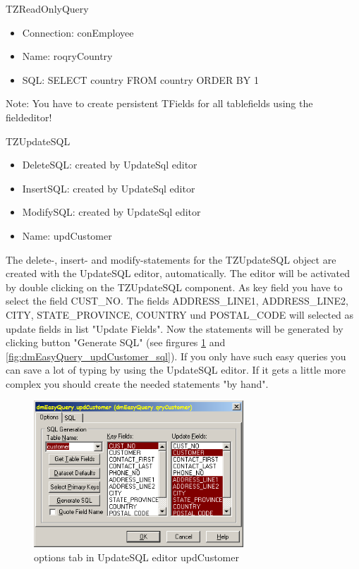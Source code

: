 \documentclass[a4paper,12pt,oneside]{book}
\begin{document}
TZReadOnlyQuery
\begin{itemize}
  \item Connection: conEmployee
	\item Name: roqryCountry
	\item SQL: SELECT country FROM country ORDER BY 1
\end{itemize}

Note: You have to create persistent TFields for all tablefields using the fieldeditor!

TZUpdateSQL
\begin{itemize}
  \item DeleteSQL: created by UpdateSql editor
  \item InsertSQL: created by UpdateSql editor
  \item ModifySQL: created by UpdateSql editor
  \item Name: updCustomer
\end{itemize}

The delete-, insert- and modify-statements for the TZUpdateSQL object are created with the UpdateSQL editor, automatically.
The editor will be activated by double clicking on the TZUpdateSQL component.
As key field you have to select the field CUST\_NO. The fields ADDRESS\_LINE1, ADDRESS\_LINE2, CITY, STATE\_PROVINCE, COUNTRY und POSTAL\_CODE will selected as update fields in list "Update Fields".
Now the statements will be generated by clicking button "Generate SQL" (see firgures \ref{fig:dmEasyQuery_updCustomer_options} and \ref{fig:dmEasyQuery_updCustomer_sql}).
If you only have such easy queries you can save a lot of typing by using the UpdateSQL editor.
If it gets a little more complex you should create the needed statements "by hand".

\begin{figure}[htbp] 
  \centering
  \includegraphics[width=0.7\textwidth]{ZeosTutorial/dmEasyQuery_updCustomer_options.png}
  \caption{options tab in UpdateSQL editor updCustomer}
  \label{fig:dmEasyQuery_updCustomer_options}
\end{figure}
\end{document}
